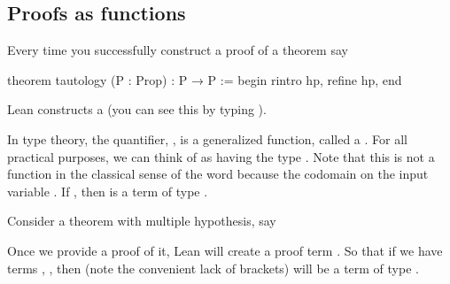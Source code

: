 \documentclass[letterpaper,10pt,english]{sphinxmanual}
\begin{document}
\subsection{Proofs as functions}
\label{\detokenize{day2:proofs-as-functions}}
\sphinxAtStartPar
Every time you successfully construct a proof of a theorem say

\begin{sphinxVerbatim}[commandchars=\\\{\}]
theorem tautology (P : Prop) : P → P :=
begin
  rintro hp,
  refine hp,
end
\end{sphinxVerbatim}

\sphinxAtStartPar
Lean constructs a  
(you can see this by typing ).

\sphinxAtStartPar
In type theory, the  quantifier, , is a generalized function, called a .
For all practical purposes, we can think of  as having the type .
Note that this is not a function in the classical sense of the word because the codomain   on the input variable .
If , then  is a term of type  .

\sphinxAtStartPar
Consider a theorem with multiple hypothesis, say

\begin{sphinxVerbatim}[commandchars=\\\{\}]
            
\end{sphinxVerbatim}

\sphinxAtStartPar
Once we provide a proof of it, Lean will create a proof term
.
So that if we have terms , , 
then  (note the convenient lack of brackets) will be a term of type .
\end{document}
